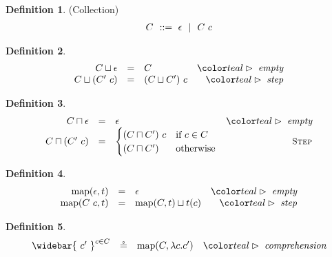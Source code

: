 \documentclass[acmsmall]{acmart}
\theoremstyle{definition}
\newtheorem{definition}{Definition}[section]
\begin{document}
\begin{definition}(Collection)
  \[\begin{array}[t]{r@{}l}
    \nonterm{C} & \is \epsilon \sep C\ c
  \end{array}\]
\end{definition}
\begin{definition}
  \[\begin{array}{rclr}
    C \sqcup \epsilon 
    &=& 
    C
    & \C{empty} 
    \\

    C \sqcup (C'\ c) 
    &=& 
    (C \sqcup C')\ c
    & \C{step} 
    \\
  \end{array}\]
\end{definition}

\begin{definition}
  \[\begin{array}{rclr}
    C \sqcap \epsilon 
    &=& 
    \epsilon 
    & \C{empty} 
    \\

    C \sqcap (C'\ c) 
    &=& 
    \begin{cases}
      (C \sqcap C')\ c & \text{if } c \in C\\
      (C \sqcap C') & \text{otherwise}
    \end{cases}
    & \D{Step} 
    \\
  \end{array}\]
\end{definition}


\begin{definition}
  \[\begin{array}{rclr}
    \text{map}(\epsilon, t)
    &=& 
    \epsilon
    & \C{empty} 
    \\

    \text{map}(C\ c, t)
    &=& 
    \text{map}(C, t) \sqcup t(c)
    & \C{step} 
    \\
  \end{array}\]
\end{definition}

\begin{definition}
  \[\begin{array}{rclr}
    \widebar{\ c'\ }^{c \in C} 
    &\circeq& 
    \text{map}(C, \lambda c . c')
    & \C{comprehension} 
    \\
  \end{array}\]
\end{definition}
\end{document}
